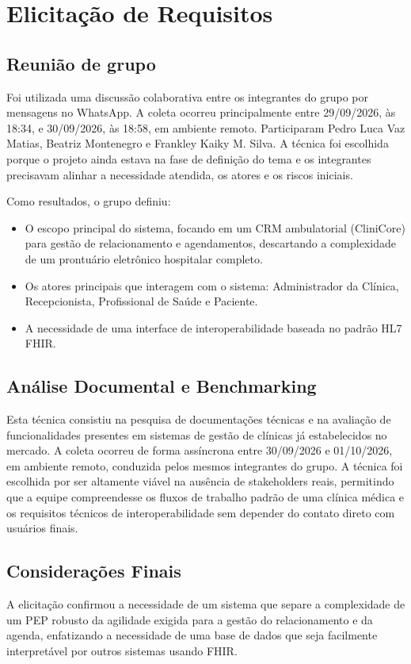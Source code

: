 \section{Elicitação de Requisitos}

\subsection{Reunião de grupo}
Foi utilizada uma discussão colaborativa entre os integrantes do grupo por mensagens no WhatsApp. A coleta ocorreu principalmente entre 29/09/2026, às 18:34, e 30/09/2026, às 18:58, em ambiente remoto. Participaram Pedro Luca Vaz Matias, Beatriz Montenegro e Frankley Kaiky M. Silva. A técnica foi escolhida porque o projeto ainda estava na fase de definição do tema e os integrantes precisavam alinhar a necessidade atendida, os atores e os riscos iniciais.

Como resultados, o grupo definiu:
\begin{itemize}
    \item O escopo principal do sistema, focando em um CRM ambulatorial (CliniCore) para gestão de relacionamento e agendamentos, descartando a complexidade de um prontuário eletrônico hospitalar completo.
    \item Os atores principais que interagem com o sistema: Administrador da Clínica, Recepcionista, Profissional de Saúde e Paciente.
    \item A necessidade de uma interface de interoperabilidade baseada no padrão HL7 FHIR.
\end{itemize}

\subsection{Análise Documental e Benchmarking}
Esta técnica consistiu na pesquisa de documentações técnicas e na avaliação de funcionalidades presentes em sistemas de gestão de clínicas já estabelecidos no mercado. A coleta ocorreu de forma assíncrona entre 30/09/2026 e 01/10/2026, em ambiente remoto, conduzida pelos mesmos integrantes do grupo. A técnica foi escolhida por ser altamente viável na ausência de stakeholders reais, permitindo que a equipe compreendesse os fluxos de trabalho padrão de uma clínica médica e os requisitos técnicos de interoperabilidade sem depender do contato direto com usuários finais.

\subsection{Considerações Finais}
A elicitação confirmou a necessidade de um sistema que separe a complexidade de um PEP robusto da agilidade exigida para a gestão do relacionamento e da agenda, enfatizando a necessidade de uma base de dados que seja facilmente interpretável por outros sistemas usando FHIR.